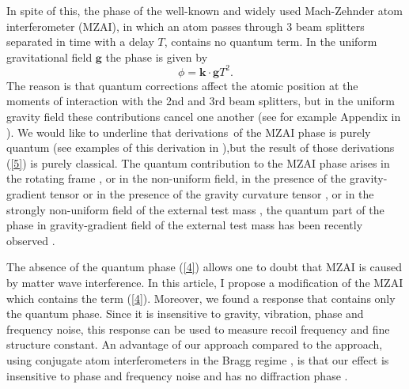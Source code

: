 \documentclass[twocolumn,showpacs,preprintnumbers]{revtex4}
\begin{document}
In spite of this, the phase of the well-known and widely used Mach-Zehnder
atom interferometer (MZAI), in which an atom passes through 3 beam splitters
separated in time with a delay $T$, contains no quantum term. In the uniform
gravitational field $\mathbf{g}$ the phase is given by \cite{c2}%
\begin{equation}
\phi =\mathbf{k}\cdot \mathbf{g}T^{2}.  \label{5}
\end{equation}%
The reason is that quantum corrections affect the atomic position at the
moments of interaction with the 2nd and 3rd beam splitters, but in the
uniform gravity field these contributions cancel one another (see for
example Appendix in \cite{c3}). We would like to underline that derivations\
of the MZAI phase is purely quantum (see examples of this derivation in \cite%
{c2,c3,c4}),but the result of those derivations (\ref{5}) is purely
classical. The quantum contribution to the MZAI phase arises in the rotating
frame \cite{c4.1}, or in the non-uniform field, in the presence of the
gravity-gradient tensor \cite{c4.2,c8} or in the presence of the gravity
curvature tensor \cite{c3}, or in the strongly non-uniform field of the
external test mass \cite{c3}, the quantum part of the phase in
gravity-gradient field of the external test mass has been recently observed 
\cite{c33}.

The absence of the quantum phase (\ref{4}) allows one to doubt that MZAI is
caused by matter wave interference. In this article, I propose a
modification of the MZAI which contains the term (\ref{4}). Moreover, we
found a response that contains only the quantum phase. Since it is
insensitive to gravity, vibration, phase and frequency noise, this response
can be used to measure recoil frequency and fine structure constant. An
advantage of our approach compared to the approach, using conjugate atom
interferometers in the Bragg regime \cite{c3.1}, is that our effect is
insensitive to phase and frequency noise and has no diffraction phase \cite%
{c3.2}.
\end{document}
